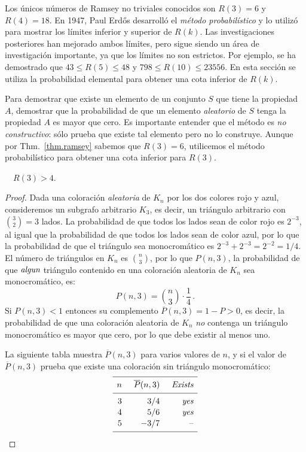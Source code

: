 Los únicos números de Ramsey no triviales conocidos son $R(3)=6$ y $R(4)=18$. En 1947, Paul Erd\H{o}s desarrolló el \emph{método probabilístico} y lo utilizó para mostrar los límites inferior y superior de $R(k)$. Las investigaciones posteriores han mejorado ambos límites, pero sigue siendo un área de investigación importante, ya que los límites no son estrictos. Por ejemplo, se ha demostrado que $43\leq R(5) \leq 48$ y $798\leq R(10)\leq 23556$. En esta sección se utiliza la probabilidad elemental para obtener una cota inferior de $R(k)$.

Para demostrar que existe un elemento de un conjunto $S$ que tiene la propiedad $A$, demostrar que la probabilidad de que un elemento \emph{aleatorio} de $S$ tenga la propiedad $A$ es mayor que cero. Es importante entender que el método es \emph{no constructivo}: sólo prueba que existe tal elemento pero no lo construye. Aunque por Thm.~\ref{thm.ramsey} sabemos que $R(3)=6$, utilicemos el método probabilístico para obtener una cota inferior para $R(3)$.
\begin{theorem}[Erd\H{o}s]
$\quad R(3) > 4$.
\end{theorem}
\begin{proof}
Dada una coloración \emph{aleatoria} de $K_n$ por los dos colores rojo y azul, consideremos un subgrafo arbitrario $K_3$, es decir, un triángulo arbitrario con $\binom{3}{2}=3$ lados. La probabilidad de que todos los lados sean de color rojo es $2^{-3}$, al igual que la probabilidad de que todos los lados sean de color azul, por lo que la probabilidad de que el triángulo sea monocromático es $2^{-3}+2^{-3}=2^{-2}=1/4$. El número de triángulos en $K_n$ es $\binom{n}{3}$, por lo que $P(n,3)$, la probabilidad de que $\emph{algun}$ triángulo contenido en una coloración aleatoria de $K_n$ sea monocromático, es:
\[
P(n,3)=\binom{n}{3}\cdot \frac{1}{4}\,.
\]
Si $P(n,3)<1$ entonces su complemento $\overline{P}(n,3)=1-P>0$, es decir, la probabilidad de que una coloración aleatoria de $K_n$ \emph{no} contenga un triángulo monocromático es mayor que cero, por lo que debe existir al menos uno.

La siguiente tabla muestra $\overline{P}(n,3)$ para varios valores de $n$, y si el valor de $\overline{P}(n,3)$ prueba que existe una coloración sin triángulo monocromático:
\[
\renewcommand*{\arraystretch}{1.1}
\begin{array}{r@{\hspace{5mm}}r@{\hspace{5mm}}r}
\hline
\noalign{\smallskip}
n & \overline{P}(n,3) & \textit{Exists}\\
\noalign{\smallskip}\hline\noalign{\smallskip}
3 & 3/4 & \textit{yes} \\
4 & 5/6 & \textit{yes}\\
5 & -3/7 & \textrm{--}\\
\noalign{\smallskip}
 \hline
 \end{array}
\]
\end{proof}
